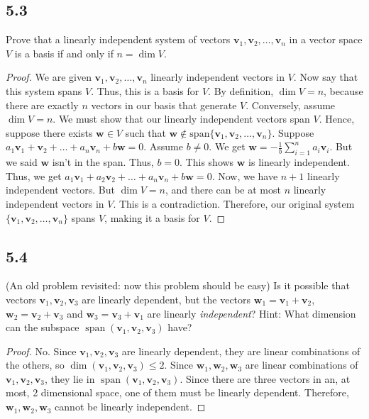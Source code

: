 \documentclass{amsart}
\begin{document}
\subsection*{5.3}
Prove that a linearly independent system of vectors $\mathbf{v}_1, \mathbf{v}_2, \ldots, \mathbf{v}_n$ in a vector space $V$ is a basis if and only if $n = \dim V$.
\begin{proof}
    We are given $\mathbf{v}_1, \mathbf{v}_2, \ldots, \mathbf{v}_n$ linearly independent vectors in $V$. Now say that this system spans $V$. Thus, this is a basis for $V$. By definition, $\dim V = n$, because there are exactly $n$ vectors in our basis that generate $V$. 
    \noindent
    Conversely, assume $\dim V = n$. We must show that our linearly independent vectors span $V$. Hence, suppose there exists $\mathbf{w}\in V$ such that $\mathbf{w} \not \in \text{span}\{\mathbf{v}_1, \mathbf{v}_2, \ldots, \mathbf{v}_n\}$. Suppose $a_1\mathbf{v}_1+ \mathbf{v}_2+ \ldots+ a_n\mathbf{v}_n + b \mathbf{w}=0$. Assume $b \neq 0$. We get $\mathbf{w} = -\frac{1}{b}\sum_{i=1}^{n}a_i\mathbf{v}_i$. But we said $\mathbf{w}$ isn't in the span. Thus, $b=0$. This shows $\mathbf{w}$ is linearly independent. Thus, we get $a_1\mathbf{v}_1+ a_2\mathbf{v}_2+ \ldots+ a_n\mathbf{v}_n + b\mathbf{w}=0.$ Now, we have $n+1$ linearly independent vectors. But $\dim V =n$, and there can be at most $n$ linearly independent vectors in $V$. This is a contradiction. Therefore, our original system $\{\mathbf{v}_1, \mathbf{v}_2, \ldots, \mathbf{v}_n\}$ spans $V$, making it a basis for $V$. 
\end{proof}

\subsection*{5.4}
(An old problem revisited: now this problem should be easy) Is it possible that vectors $\mathbf{v}_1, \mathbf{v}_2, \mathbf{v}_3$ are linearly dependent, but the vectors $\mathbf{w}_1 = \mathbf{v}_1 + \mathbf{v}_2$, $\mathbf{w}_2 = \mathbf{v}_2 + \mathbf{v}_3$ and $\mathbf{w}_3 = \mathbf{v}_3 + \mathbf{v}_1$ are linearly \emph{independent}? Hint: What dimension can the subspace $\operatorname{span}(\mathbf{v}_1, \mathbf{v}_2, \mathbf{v}_3)$ have?
\begin{proof}
    No. Since $\mathbf{v}_1, \mathbf{v}_2, \mathbf{v}_3$ are linearly dependent, they are linear combinations of the others, so $\dim (\mathbf{v}_1, \mathbf{v}_2, \mathbf{v}_3) \le 2$. Since $\mathbf{w}_1, \mathbf{w}_2, \mathbf{w}_3$ are linear combinations of $\mathbf{v}_1, \mathbf{v}_2, \mathbf{v}_3$, they lie in $\operatorname{span}(\mathbf{v}_1, \mathbf{v}_2, \mathbf{v}_3)$. Since there are three vectors in an, at most, 2 dimensional space, one of them must be linearly dependent. Therefore, $\mathbf{w}_1, \mathbf{w}_2, \mathbf{w}_3$ cannot be linearly independent.
\end{proof}
\end{document}
